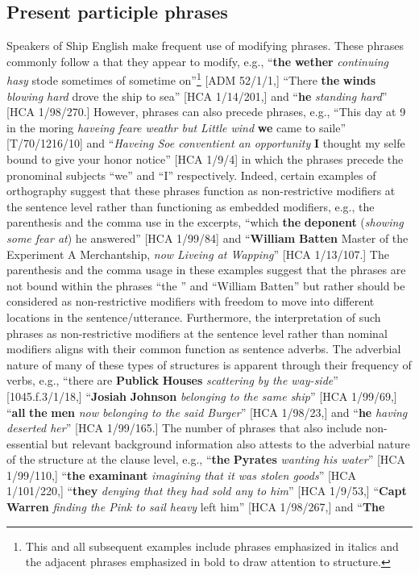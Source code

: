 \subsection{{Present participle phrases} }%

Speakers of Ship English make frequent use of modifying  phrases. These  phrases commonly follow a  that they appear to modify, e.g., “\textbf{the} \textbf{wether} \textit{continuing hasy} stode sometimes of sometime on”\footnote{This and all subsequent examples include  phrases emphasized in italics and the adjacent  phrases emphasized in bold to draw attention to structure.} [ADM 52/1/1,] “There \textbf{the} \textbf{winds} \textit{blowing hard} drove the ship to sea” [HCA 1/14/201,] and “\textbf{he} \textit{standing hard}” [HCA 1/98/270.] However,  phrases can also precede  phrases, e.g., “This day at 9 in the moring \textit{haveing feare weathr but Little wind} \textbf{we} came to saile” [T/70/1216/10] and “\textit{Haveing Soe conventient an opportunity} \textbf{I} thought my selfe bound to give your honor notice” [HCA 1/9/4] in which the  phrases precede the pronominal subjects “we” and “I” respectively. Indeed, certain examples of orthography suggest that these phrases function as non-restrictive modifiers at the sentence level rather than functioning as embedded   modifiers, e.g., the parenthesis and the comma use in the excerpts, “which \textbf{the} \textbf{deponent} (\textit{showing some fear at}) he answered” [HCA 1/99/84] and “\textbf{William} \textbf{Batten} Master of the Experiment A Merchantship, \textit{now Liveing at Wapping}” [HCA 1/13/107.] The parenthesis and the comma usage in these examples suggest that the phrases are not bound within the  phrases “the ” and “William Batten” but rather should be considered as non-restrictive modifiers with freedom to move into different locations in the sentence/utterance. Furthermore, the interpretation of such phrases as non-restrictive modifiers at the sentence level rather than nominal modifiers aligns with their common function as sentence adverbs. The adverbial nature of many of these types of structures is apparent through their frequency of  verbs, e.g., “there are \textbf{Publick} \textbf{Houses} \textit{scattering by the way-side}” [1045.f.3/1/18,] “\textbf{Josiah} \textbf{Johnson} \textit{belonging to the same ship}” [HCA 1/99/69,] “\textbf{all} \textbf{the} \textbf{men} \textit{now belonging to the said Burger}” [HCA 1/98/23,] and “\textbf{he} \textit{having deserted her}” [HCA 1/99/165.] The number of phrases that also include non-essential but relevant background information also attests to the adverbial nature of the structure at the clause level, e.g., “\textbf{the} \textbf{Pyrates} \textit{wanting his water}” [HCA 1/99/110,] “\textbf{the} \textbf{examinant} \textit{imagining that it was stolen goods}” [HCA 1/101/220,] “\textbf{they} \textit{denying that they had sold any to him}” [HCA 1/9/53,] “\textbf{Capt} \textbf{Warren} \textit{finding the Pink to sail heavy} left him” [HCA 1/98/267,] and “\textbf{The} 